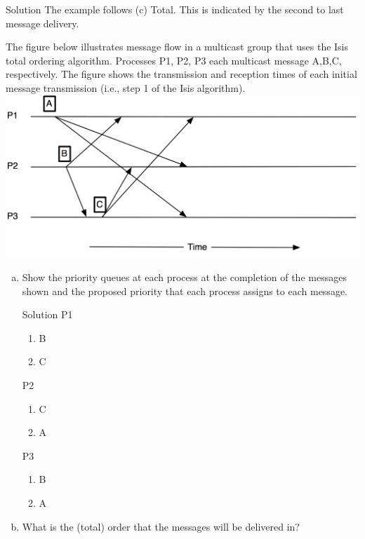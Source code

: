 \documentclass{article}
\begin{document}
\begin{spacing}{1.1}
\begin{homeworkProblem}
	\begin{homeworkSection}{Solution}
		The example follows (c) Total.  This is indicated by the second to last message delivery.  
	\end{homeworkSection}
\end{homeworkProblem}
\newpage
\begin{homeworkProblem}
The figure below illustrates message flow in a multicast group that uses the Isis total ordering algorithm. Processes P1, P2, P3 each multicast message A,B,C, respectively. The figure shows the transmission and reception times of each initial message transmission (i.e., step 1 of the Isis algorithm).
	\\ \includegraphics[width=\linewidth]{prob6.png}
	\begin{enumerate}[(a)]
		\item Show the priority queues at each process at the completion of the messages shown and the proposed priority that each process assigns to each message.
			\begin{homeworkSection}{Solution}
				P1
					\begin{enumerate}[(1)]
						\item B
						\item C
					\end{enumerate}
				P2
					\begin{enumerate}[(1)]
						\item C
						\item A
					\end{enumerate}
				P3
					\begin{enumerate}[(1)]
						\item B
						\item A
					\end{enumerate}
			\end{homeworkSection}
		\item What is the (total) order that the messages will be delivered in?

\end{enumerate}
\end{homeworkProblem}
\end{spacing}
\end{document}
